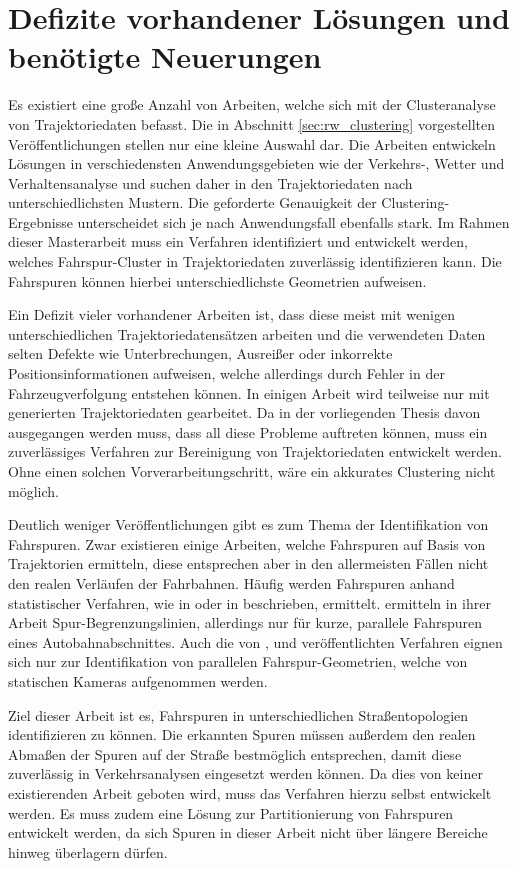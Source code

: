 \section{Defizite vorhandener Lösungen und benötigte Neuerungen}
\label{sec:rw_deficites}

Es existiert eine große Anzahl von Arbeiten, welche sich mit der Clusteranalyse von Trajektoriedaten
befasst. Die in Abschnitt \ref{sec:rw_clustering} vorgestellten Veröffentlichungen stellen nur eine
kleine Auswahl dar.
Die Arbeiten entwickeln Lösungen in verschiedensten Anwendungsgebieten wie der Verkehrs-, Wetter und Verhaltensanalyse
und suchen daher in den Trajektoriedaten nach unterschiedlichsten Mustern. Die geforderte Genauigkeit der
Clustering-Ergebnisse unterscheidet sich je nach Anwendungsfall ebenfalls stark.
Im Rahmen dieser Masterarbeit muss ein Verfahren identifiziert und entwickelt werden, welches Fahrspur-Cluster
in Trajektoriedaten zuverlässig identifizieren kann. Die Fahrspuren können hierbei unterschiedlichste
Geometrien aufweisen.

Ein Defizit vieler vorhandener Arbeiten ist, dass diese meist mit wenigen unterschiedlichen
Trajektoriedatensätzen arbeiten und die verwendeten Daten selten Defekte wie Unterbrechungen,
Ausreißer oder inkorrekte Positionsinformationen aufweisen, welche allerdings durch Fehler in der Fahrzeugverfolgung entstehen können.
In einigen Arbeit wird teilweise nur mit generierten Trajektoriedaten gearbeitet.
Da in der vorliegenden Thesis davon ausgegangen werden muss, dass all diese Probleme auftreten können,
muss ein zuverlässiges Verfahren zur Bereinigung von Trajektoriedaten entwickelt werden. Ohne einen solchen Vorverarbeitungschritt,
wäre ein akkurates Clustering nicht möglich.

Deutlich weniger Veröffentlichungen gibt es zum Thema der Identifikation von Fahrspuren. Zwar existieren
einige Arbeiten, welche Fahrspuren auf Basis von Trajektorien ermitteln, diese entsprechen aber
in den allermeisten Fällen nicht den realen Verläufen der Fahrbahnen. Häufig werden Fahrspuren
anhand statistischer Verfahren, wie in \cite[]{WeimingHu2006} oder in \cite[]{Teng2015} beschrieben, ermittelt.
\cite[]{Hsieh2006} ermitteln in ihrer Arbeit Spur-Begrenzungslinien, allerdings nur für kurze, parallele
Fahrspuren eines Autobahnabschnittes. Auch die von \cite[]{Liu2010}, \cite[]{Sochor2014} und \cite[]{Chen2013}
veröffentlichten Verfahren eignen sich nur zur Identifikation von parallelen Fahrspur-Geometrien,
welche von statischen Kameras aufgenommen werden.

Ziel dieser Arbeit ist es, Fahrspuren in unterschiedlichen Straßentopologien identifizieren zu können.
Die erkannten Spuren müssen außerdem den realen Abmaßen der Spuren auf der Straße bestmöglich entsprechen,
damit diese zuverlässig in Verkehrsanalysen eingesetzt werden können. 
Da dies von keiner existierenden Arbeit geboten wird, muss das Verfahren hierzu selbst entwickelt werden.
Es muss zudem eine Lösung zur Partitionierung von Fahrspuren entwickelt werden, da sich Spuren
in dieser Arbeit nicht über längere Bereiche hinweg überlagern dürfen.